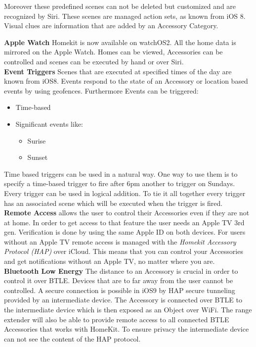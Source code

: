 			Moreover these predefined scenes can not be deleted but customized and are recognized by Siri. These scenes are managed action sets, as known from iOS 8. Visual clues are information that are added by an Accessory Category.

			\textbf{Apple Watch} Homekit is now available on watchOS2. All the home data is mirrored on the Apple Watch. Homes can be viewed, Accessories can be controlled and scenes can be executed by hand or over Siri.\\

			\textbf{Event Triggers} Scenes that are executed at specified times of the day are known from iOS8. Events respond to the state of an Accessory or location based events by using geofences. Furthermore Events can be triggered:

			\begin{itemize}
				\item Time-based
				\item Significant events like:
					\begin{itemize}
						\item Surise
						\item Sunset
					\end{itemize}
			\end{itemize}

			Time based triggers can be used in a natural way. One way to use them is to specify a time-based trigger to fire after 6pm another to trigger on Sundays. Every trigger can be used in logical addition. To tie it all together every trigger has an associated scene which will be executed when the trigger is fired.\\

			\textbf{Remote Access} allows the user to control their Accessories even if they are not at home. In order to get access to that feature the user needs an Apple TV 3rd gen. Verification is done by using the same Apple ID on both devices. For users without an Apple TV remote access is managed with the \textit{Homekit Accessory Protocol (HAP)} over iCloud. This means that you can control your Accessories and get notifications without an Apple TV, no matter where you are.\\ 

			\textbf{Bluetooth Low Energy} The distance to an Accessory is crucial in order to control it over BTLE. Devices that are to far away from the user cannot be controlled. A secure connection is possible in iOS9 by HAP secure tunneling provided by an intermediate device. The Accessory is connected over BTLE to the intermediate device which is then exposed as an Object over WiFi. The range extender will also be able to provide remote access to all connected BTLE Accessories that works with HomeKit. To ensure privacy the intermediate device can not see the content of the HAP protocol.\\

